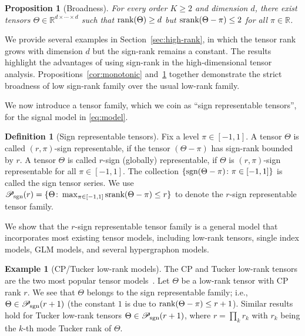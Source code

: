 \documentclass[11pt]{article}
\theoremstyle{plain}
\newtheorem{prop}{Proposition}
\theoremstyle{definition}
\newtheorem{defn}{Definition}
\newtheorem{example}{Example}
\def\sign{\textup{sgn}}
\def\srank{\textup{srank}}
\def\rank{\textup{rank}}
\def\caliP{\mathscr{P}_{\textup{sgn}}}
\begin{document}
\begin{prop}[Broadness]\label{prop:extention}\label{cor:broadness}For every order $K\geq 2$ and dimension $d$, there exist tensors $\Theta\in\mathbb{R}^{d\times \cdots \times d}$ such that $\rank(\Theta)\geq d$ but $\srank(\Theta-\pi)\leq 2$ for all $\pi\in\mathbb{R}$.  
\end{prop}
We provide several examples in Section~\ref{sec:high-rank}, in which the tensor rank grows with dimension $d$ but the sign-rank remains a constant. The results highlight the advantages of using sign-rank in the high-dimensional tensor analysis. Propositions~\ref{cor:monotonic} and~\ref{prop:extention} together demonstrate the strict broadness of low sign-rank family over the usual low-rank family. 

We now introduce a tensor family, which we coin as ``sign representable tensors'', for the signal model in \eqref{eq:model}.\\
\begin{defn}[Sign representable tensors] 
Fix a level $\pi\in[-1,1]$. A tensor $\Theta$ is called $(r,\pi)$-sign representable, if the tensor $(\Theta-\pi)$ has sign-rank bounded by $r$. A tensor $\Theta$ is called $r$-sign (globally) representable, if $\Theta$ is $(r,\pi)$-sign representable for all $\pi\in[-1,1]$. The collection $\{\sign(\Theta-\pi)\colon \pi \in[-1,1]\}$ is called the sign tensor series. 
We use $\caliP(r)=\{\Theta\colon \max_{\pi\in[-1,1]}\srank(\Theta-\pi)\leq r\}$ to denote the $r$-sign representable tensor family.
\end{defn}

We show that the $r$-sign representable tensor family is a general model that incorporates most existing tensor models, including low-rank tensors, single index models, GLM models, and several hypergraphon models. \\

\begin{example}[CP/Tucker low-rank models] The CP and Tucker low-rank tensors are the two most popular tensor models~\citep{kolda2009tensor}. Let $\Theta$ be a low-rank tensor with CP rank $r$. We see that $\Theta$ belongs to the sign representable family; i.e., $\Theta\in\caliP(r+1)$ (the constant $1$ is due to $\rank(\Theta-\pi)\leq r+1$). Similar results hold for Tucker low-rank tensors $\Theta\in\caliP(r+1)$, where $r=\prod_kr_k$ with $r_k$ being the $k$-th mode Tucker rank of $\Theta$.  \\
\end{example} 
\end{document}

